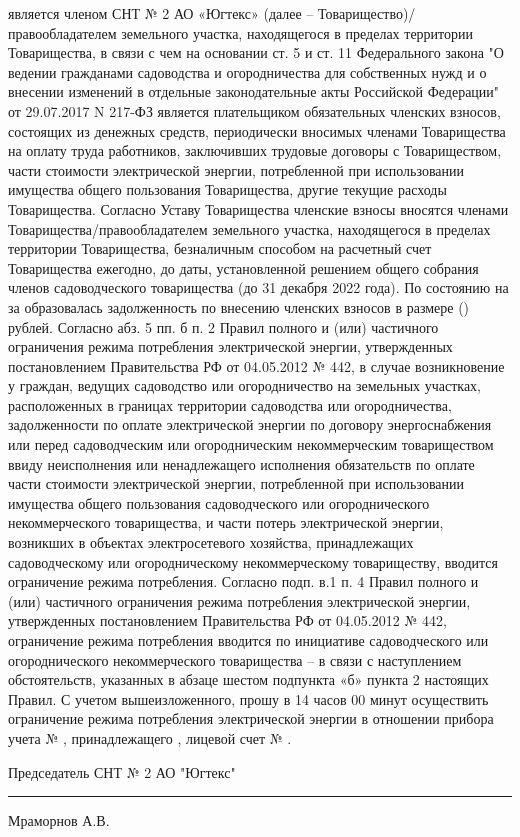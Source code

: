  является членом СНТ № 2 АО «Югтекс» (далее – Товарищество)/правообладателем земельного участка, находящегося в пределах территории Товарищества, в связи с чем на основании ст. 5 и ст. 11    Федерального закона  "О ведении гражданами садоводства и огородничества для собственных нужд и о внесении изменений в отдельные законодательные акты Российской Федерации"   от 29.07.2017 N 217-ФЗ является плательщиком обязательных членских взносов, состоящих из денежных средств, периодически вносимых членами Товарищества на оплату труда работников, заключивших трудовые договоры с Товариществом, части стоимости электрической энергии, потребленной при использовании имущества общего пользования Товарищества,
другие текущие расходы Товарищества. 
Согласно Уставу Товарищества членские взносы вносятся членами Товарищества/правообладателем земельного участка, находящегося в пределах территории Товарищества, безналичным способом на расчетный счет Товарищества ежегодно, до даты, установленной решением общего собрания членов садоводческого товарищества    (до 31  декабря 2022 года). 
По состоянию на     за  образовалась задолженность по внесению членских взносов в размере  () рублей.
Согласно абз. 5 пп. б п. 2 Правил полного и (или) частичного ограничения режима потребления электрической энергии, утвержденных постановлением Правительства РФ от 04.05.2012 № 442, в случае возникновение у граждан, ведущих садоводство или огородничество на земельных участках, расположенных в границах территории садоводства или огородничества, задолженности по оплате электрической энергии по договору энергоснабжения или перед садоводческим или огородническим некоммерческим товариществом ввиду неисполнения или ненадлежащего исполнения обязательств по оплате части стоимости электрической энергии, потребленной при использовании имущества общего пользования садоводческого или огороднического некоммерческого товарищества, и части потерь электрической энергии, возникших в объектах электросетевого хозяйства, принадлежащих садоводческому или огородническому некоммерческому товариществу, вводится ограничение режима потребления.
Согласно подп. в.1 п. 4 Правил полного и (или) частичного ограничения режима потребления электрической энергии, утвержденных постановлением Правительства РФ от 04.05.2012 № 442, ограничение режима потребления вводится по инициативе садоводческого или огороднического некоммерческого товарищества – в связи с наступлением обстоятельств, указанных в абзаце шестом подпункта «б» пункта 2 настоящих Правил.
С учетом вышеизложенного,  прошу в 14 часов 00 минут   осуществить ограничение режима потребления электрической энергии в отношении прибора учета  №  , принадлежащего , лицевой счет № . 

\vspace{5mm}



\vspace{15mm}
\noindent Председатель СНТ № 2 АО "Югтекс" \hfill    \rule{3cm}{0.1 mm}    Мраморнов А.В.